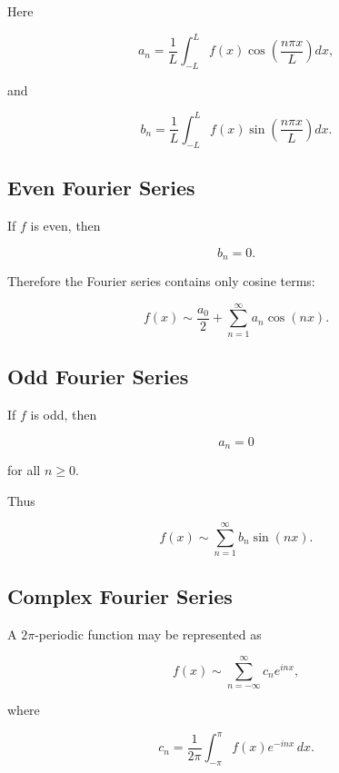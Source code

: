 Here

\[
\boxed{
a_n
=
\frac1L
\int_{-L}^{L}
f(x)
\cos\left(
\frac{n\pi x}{L}
\right)
dx,
}
\]

and

\[
\boxed{
b_n
=
\frac1L
\int_{-L}^{L}
f(x)
\sin\left(
\frac{n\pi x}{L}
\right)
dx.
}
\]

\subsection{Even Fourier Series}
\label{subsec:even-fourier-series-reference}

If \(f\) is even, then

\[
\boxed{
b_n=0.
}
\]

Therefore the Fourier series contains only cosine terms:

\[
\boxed{
f(x)
\sim
\frac{a_0}{2}
+
\sum_{n=1}^{\infty}
a_n\cos(nx).
}
\]

\subsection{Odd Fourier Series}
\label{subsec:odd-fourier-series-reference}

If \(f\) is odd, then

\[
\boxed{
a_n=0
}
\]

for all \(n\geq0\).

Thus

\[
\boxed{
f(x)
\sim
\sum_{n=1}^{\infty}
b_n\sin(nx).
}
\]

\subsection{Complex Fourier Series}
\label{subsec:complex-fourier-series-reference}

A \(2\pi\)-periodic function may be represented as

\[
\boxed{
f(x)
\sim
\sum_{n=-\infty}^{\infty}
c_n e^{inx},
}
\]

where

\[
\boxed{
c_n
=
\frac{1}{2\pi}
\int_{-\pi}^{\pi}
f(x)e^{-inx}\,dx.
}
\]


